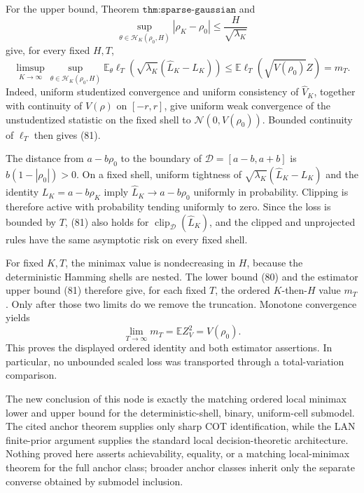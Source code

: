 For the upper bound, Theorem \(\texttt{thm:sparse-gaussian}\) and
\[
 \sup_{\theta\in\mathcal H_K(\rho_0,H)}
 |\rho_K-\rho_0|\le\frac H{\sqrt{\lambda_K}}
\]
give, for every fixed \(H,T\),
\[
 \limsup_{K\to\infty}
 \sup_{\theta\in\mathcal H_K(\rho_0,H)}
 \mathbb E_\theta\ell_T\!\left(
 \sqrt{\lambda_K}(\widehat L_K-L_K)\right)
 \le
 \mathbb E\ell_T(\sqrt{V(\rho_0)}Z)
 =m_T.
 \tag{81}
\]
Indeed, uniform studentized convergence and uniform consistency of
\(\widehat V_K\), together with continuity of \(V(\rho)\) on
\([-r,r]\), give uniform weak convergence of the unstudentized statistic
on the fixed shell to \(\mathcal N(0,V(\rho_0))\).  Bounded continuity
of \(\ell_T\) then gives (81).

The distance from \(a-b\rho_0\) to the boundary of
\(\mathcal D=[a-b,a+b]\) is \(b(1-|\rho_0|)>0\).  On a fixed shell,
uniform tightness of \(\sqrt{\lambda_K}(\widehat L_K-L_K)\) and the
identity \(L_K=a-b\rho_K\) imply
\(\widehat L_K\to a-b\rho_0\) uniformly in probability.  Clipping is
therefore active with probability tending uniformly to zero.  Since the
loss is bounded by \(T\), (81) also holds for
\(\operatorname{clip}_{\mathcal D}(\widehat L_K)\), and the clipped and
unprojected rules have the same asymptotic risk on every fixed shell.

For fixed \(K,T\), the minimax value is nondecreasing in \(H\), because
the deterministic Hamming shells are nested.  The lower bound (80) and
the estimator upper bound (81) therefore give, for each fixed \(T\),
the ordered \(K\)-then-\(H\) value \(m_T\).  Only after those two limits
do we remove the truncation.  Monotone convergence yields
\[
 \lim_{T\to\infty}m_T
 =\mathbb EZ_V^2
 =V(\rho_0).
 \tag{82}
\]
This proves the displayed ordered identity and both estimator
assertions.  In particular, no unbounded scaled loss was transported
through a total-variation comparison.

The new conclusion of this node is exactly the matching ordered local
minimax lower and upper bound for the deterministic-shell, binary,
uniform-cell submodel.  The cited anchor theorem supplies only sharp COT
identification, while the LAN finite-prior argument supplies the
standard local decision-theoretic architecture.  Nothing proved here
asserts achievability, equality, or a matching local-minimax theorem for
the full anchor class; broader anchor classes inherit only the separate
converse obtained by submodel inclusion.

